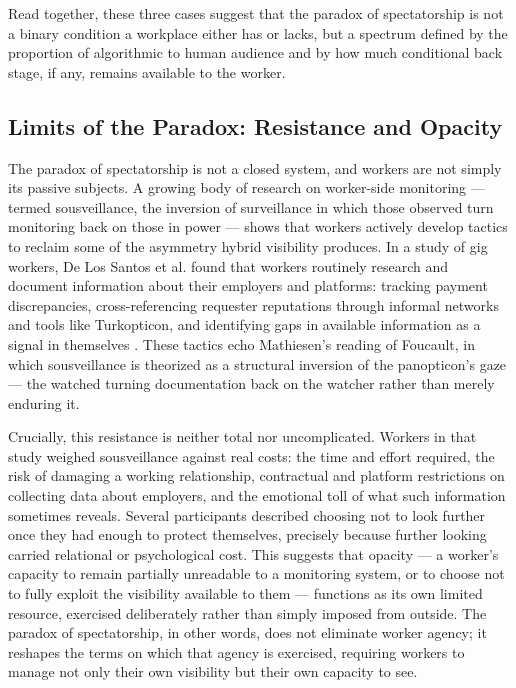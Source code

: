 \documentclass[10pt]{article}
\begin{document}
Read together, these three cases suggest that the paradox of spectatorship is not a binary condition a workplace either has or lacks, but a spectrum defined by the proportion of algorithmic to human audience and by how much conditional back stage, if any, remains available to the worker.

\subsection{Limits of the Paradox: Resistance and Opacity}

The paradox of spectatorship is not a closed system, and workers are not simply its passive subjects. A growing body of research on worker-side monitoring --- termed sousveillance, the inversion of surveillance in which those observed turn monitoring back on those in power --- shows that workers actively develop tactics to reclaim some of the asymmetry hybrid visibility produces. In a study of gig workers, De Los Santos et al. found that workers routinely research and document information about their employers and platforms: tracking payment discrepancies, cross-referencing requester reputations through informal networks and tools like Turkopticon, and identifying gaps in available information as a signal in themselves \cite{delossantos}. These tactics echo Mathiesen's reading of Foucault, in which sousveillance is theorized as a structural inversion of the panopticon's gaze --- the watched turning documentation back on the watcher rather than merely enduring it.

Crucially, this resistance is neither total nor uncomplicated. Workers in that study weighed sousveillance against real costs: the time and effort required, the risk of damaging a working relationship, contractual and platform restrictions on collecting data about employers, and the emotional toll of what such information sometimes reveals. Several participants described choosing not to look further once they had enough to protect themselves, precisely because further looking carried relational or psychological cost. This suggests that opacity --- a worker's capacity to remain partially unreadable to a monitoring system, or to choose not to fully exploit the visibility available to them --- functions as its own limited resource, exercised deliberately rather than simply imposed from outside. The paradox of spectatorship, in other words, does not eliminate worker agency; it reshapes the terms on which that agency is exercised, requiring workers to manage not only their own visibility but their own capacity to see.
\end{document}
